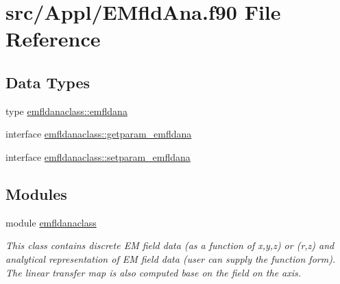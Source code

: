 \hypertarget{_e_mfld_ana_8f90}{}\section{src/\+Appl/\+E\+Mfld\+Ana.f90 File Reference}
\label{_e_mfld_ana_8f90}
\subsection*{Data Types}
\begin{DoxyCompactItemize}
\item 
type \mbox{\hyperlink{namespaceemfldanaclass_structemfldanaclass_1_1emfldana}{emfldanaclass\+::emfldana}}
\item 
interface \mbox{\hyperlink{interfaceemfldanaclass_1_1getparam__emfldana}{emfldanaclass\+::getparam\+\_\+emfldana}}
\item 
interface \mbox{\hyperlink{interfaceemfldanaclass_1_1setparam__emfldana}{emfldanaclass\+::setparam\+\_\+emfldana}}
\end{DoxyCompactItemize}
\subsection*{Modules}
\begin{DoxyCompactItemize}
\item 
module \mbox{\hyperlink{namespaceemfldanaclass}{emfldanaclass}}
\begin{DoxyCompactList}\small\item\em This class contains discrete EM field data (as a function of x,y,z) or (r,z) and analytical representation of EM field data (user can supply the function form). The linear transfer map is also computed base on the field on the axis. \end{DoxyCompactList}\end{DoxyCompactItemize}
